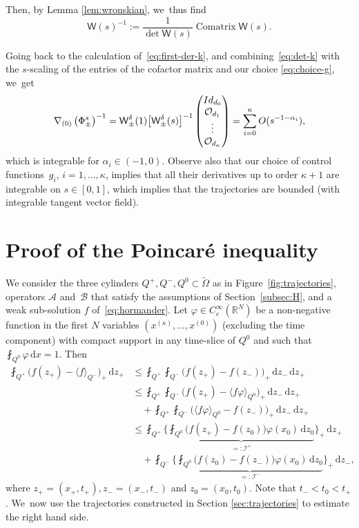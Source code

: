 \documentclass[10pt,a4paper]{amsart}
\theoremstyle{definition}
\newcommand\R{{\mathbb R}}
\newcommand{\cI}{{\mathcal I}}
\newcommand{\sW}{{\mathsf W}}
\newcommand{\dd}{{\, \mathrm d}}
\begin{document}
Then, by Lemma \ref{lem:wronskian}, we~thus find
\begin{equation*}
\sW (s)^{-1} :=
\frac{1}{\det \sW(s)} \operatorname{Comatrix} \sW(s).
\end{equation*}

Going back to the calculation of~\eqref{eq:first-der-k}, and combining~\eqref{eq:det-k}
with the $s$-scaling of the entries of the cofactor matrix and our choice \eqref{eq:choice-g}, we~get
\begin{equation}
\label{eq:grad-phi}
\nabla_{(0)} \left(\Phi^s_\pm \right)^{-1}
= \sW_\pm ^\delta (1) \big[\sW_\pm ^\delta(s)\big]^{-1}
\begin{pmatrix}
\Id_{d_0} \\ \OO_{d_1} \\ \vdots \\ \OO_{d_\kappa}
\end{pmatrix}
= \sum_{i=0} ^\kappa O(s^{-1-\alpha_i}),
\end{equation}
which is integrable for $\alpha_i \in (-1,0)$. Observe also that
our choice of control functions~$g_i$, $i=1,\dots,\kappa$,
implies that all their derivatives up to order $\kappa+1$ are
integrable on $s \in [0,1]$, which implies that the trajectories
are bounded (with integrable tangent vector field).

\section{Proof of the Poincaré inequality}
\label{sec:proof}

We consider the three cylinders $Q^+,Q^-, Q^0 \subset \tilde \Omega$ as
in Figure~\ref{fig:trajectories}, operators $\mathcal A$ and~$\mathcal B$ that satisfy the assumptions of Section~\ref{subsec:H}, and a weak sub-solution $f$
of~\eqref{eq:hormander}. Let $\varphi \in C_c^\infty(\R^{N})$ be a
non-negative function in the first $N$ variables
$(x^{(\kappa)},\dots,x^{(0)})$ (excluding the time component)
with compact support in any time-slice of $Q^0$ and such that
$\fint_{Q^0} \varphi \dd x = 1$. Then
\begin{equation}
\label{eq:poincare-aux}
\begin{aligned}
\fint_{Q^+} \Big(f(z_+) - \langle f\rangle_{Q^-}\Big)_+ \dd
z_+ & \leq \fint_{Q^+} \fint_{Q^-} \Big(f(z_+) - f(z_{-})
\Big)_+
\dd z_{-} \dd z_+ \\
& \leq \fint_{Q^+} \fint_{Q^-} \Big(f(z_+) - \langle
f\varphi\rangle_{Q^0}\Big)_+\dd z_{-} \dd z_+ \\
&\quad + \fint_{Q^+} \fint_{Q^-} \Big(\langle
f\varphi\rangle_{Q^0} - f(z_{-})\Big)_+ \dd z_{-}\dd z_+ \\
& \leq \fint_{Q^+} \Bigg\{\underbrace{\fint_{Q^0} \big(f(z_+)
- f(z_0)\big)\varphi(x_0) \dd z_0}_{=: \cI^+}
\Bigg\}_+ \dd z_+ \\
& \quad + \fint_{Q^-} \Bigg\{\underbrace{\fint_{Q^0}
\big(f(z_0) - f(z_{-})\big)\varphi(x_0) \dd z_0}_{=:
\cI^-}\Bigg\}_+ \dd z_{-},
\end{aligned}
\end{equation}
where $z_+ = (x_+, t_+), z_- = (x_-, t_-)$ and
$z_0 = (x_0, t_0)$. Note that $t_{-} < t_0 < t_+$. We~now use
the trajectories constructed in Section \ref{sec:trajectories} to
estimate the right hand side.
\end{document}
